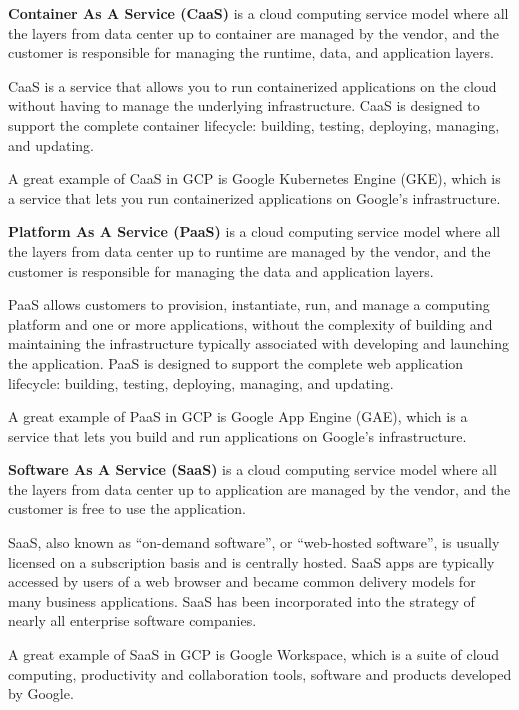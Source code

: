 \textbf{Container As A Service (CaaS)} is a cloud computing service model where all the layers from data center up to
container are managed by the vendor, and the customer is responsible for managing the runtime, data, and application
layers.
\ed

CaaS is a service that allows you to run containerized applications on the cloud without having to manage the underlying
infrastructure. CaaS is designed to support the complete container lifecycle: building, testing, deploying, managing,
and updating.

\be
A great example of CaaS in GCP is Google Kubernetes Engine (GKE), which is a service that lets you run containerized
applications on Google's infrastructure.
\ee

\textbf{Platform As A Service (PaaS)} is a cloud computing service model where all the layers from data center up to
runtime are managed by the vendor, and the customer is responsible for managing the data and application layers.
\ed

PaaS allows customers to provision, instantiate, run, and manage a computing platform and one or more applications,
without the complexity of building and maintaining the infrastructure typically associated with developing and launching
the application. PaaS is designed to support the complete web application lifecycle: building, testing, deploying,
managing, and updating.

\be
A great example of PaaS in GCP is Google App Engine (GAE), which is a service that lets you build and run applications
on Google's infrastructure.
\ee

\textbf{Software As A Service (SaaS)} is a cloud computing service model where all the layers from data center up to
application are managed by the vendor, and the customer is free to use the application.
\ed

SaaS, also known as ``on-demand software'', or ``web-hosted software'', is usually licensed on a subscription basis
and is centrally hosted. SaaS apps are typically accessed by users of a web browser and became common delivery models
for many business applications. SaaS has been incorporated into the strategy of nearly all enterprise software
companies.

\be
A great example of SaaS in GCP is Google Workspace, which is a suite of cloud computing, productivity and collaboration
tools, software and products developed by Google.
\ee

